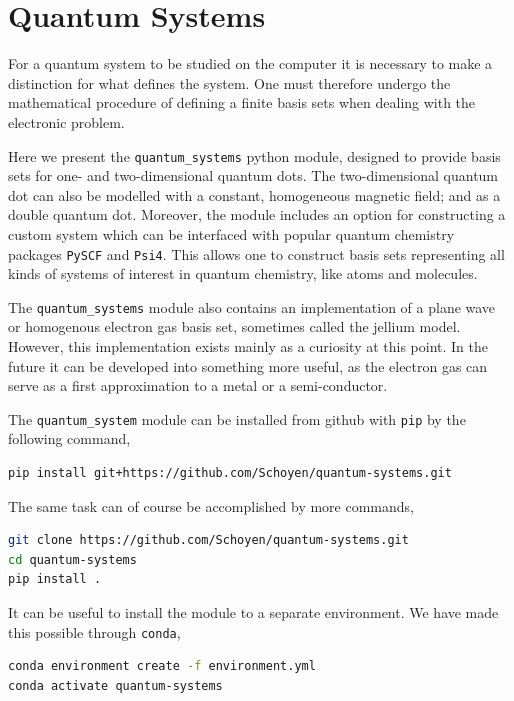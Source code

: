 \chapter{Quantum Systems}

For a quantum system to be studied on the computer it is necessary to 
make a distinction for what defines the system. One must therefore undergo the
mathematical procedure of defining a finite basis sets
when dealing with the electronic problem. 

Here we present the \lstinline{quantum_systems} python module, designed to 
provide basis sets for one- and two-dimensional quantum dots. The two-dimensional 
quantum dot can also be modelled with a constant, homogeneous magnetic field; and 
as a double quantum dot. 
Moreover, the module includes an option for constructing a custom system which can 
be interfaced with popular quantum chemistry packages \lstinline{PySCF}\cite{PYSCF} 
and \lstinline{Psi4}\cite{parrish2017psi4}. This allows one to construct basis sets 
representing all kinds of systems of interest in quantum chemistry, like atoms and 
molecules. 

The \lstinline{quantum_systems} module also contains an implementation of 
a plane wave or homogenous electron gas basis set, sometimes called the 
jellium model. However, this implementation exists mainly as 
a curiosity at this point. In the future it can be developed into something more useful,
as the electron gas can serve as a first approximation to a metal or a semi-conductor.

The \lstinline{quantum_system} module can be installed from github with \lstinline{pip}
by the following command,
\begin{lstlisting}[language=bash]
pip install git+https://github.com/Schoyen/quantum-systems.git
\end{lstlisting}
The same task can of course be accomplished by more commands,
\begin{lstlisting}[language=bash]
git clone https://github.com/Schoyen/quantum-systems.git
cd quantum-systems
pip install .
\end{lstlisting}

It can be useful to install the module to a separate environment. We have made this 
possible through \lstinline{conda},
\begin{lstlisting}[language=bash]
conda environment create -f environment.yml
conda activate quantum-systems    
\end{lstlisting}

